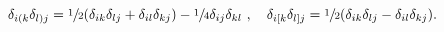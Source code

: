 \begin{equation}
\delta_{i(k}\delta_{l)j}= \sfrac{1}{2}(\delta_{ik} 
\delta_{lj} +\delta_{il} \delta_{kj}) 
- \sfrac{1}{4}\delta_{ij}\delta_{kl} \ , \quad
\delta_{i[k}\delta_{l]j}= \sfrac{1}{2}(\delta_{ik} 
\delta_{lj} -\delta_{il} \delta_{kj}) .
\label{sdel}
\end{equation}

